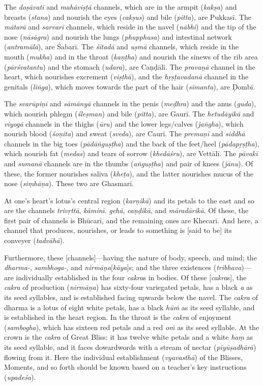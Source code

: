 \documentclass[naipra.tex]{subfiles}
\begin{document}
The \emph{doṣāvatī} and \emph{mahāviṣṭā} channels, which are in the armpit (\emph{kakṣa}) and breasts (\emph{stana}) and nourish the eyes (\emph{cakṣus}) and bile (\emph{pitta}), are Pukkasī.
The \emph{mātarā} and \emph{sarvarī} channels, which reside in the navel (\emph{nābhi}) and the tip of the nose (\emph{nāsāgra}) and nourish the lungs (\emph{phupphusa}) and intestinal network (\emph{antramālā}), are Śabarī.
The \emph{śītadā} and \emph{uṣmā} channels, which reside in the mouth (\emph{mukha}) and in the throat (\emph{kaṇṭha}) and nourish the sinews of the rib area (\emph{pārśvatantu}) and the stomach (\emph{udara}), are Caṇḍālī.
The \emph{pravaṇā} channel in the heart, which nourishes excrement (\emph{viṣṭhā}), and the \emph{hṛṣṭavadanā} channel in the genitals (\emph{liṅga}), which moves towards the part of the hair (\emph{sīmanta}), are Ḍombī.

The \emph{svarūpiṇī} and \emph{sāmānyā} channels in the penis (\emph{meḍhra}) and the anus (\emph{guda}), which nourish phlegm (\emph{śleṣman}) and bile (\emph{pitta}), are Gaurī.
The \emph{hetudāyikā} and \emph{viyogā} channels in the thighs (\emph{ūru}) and the lower legs/calves (\emph{jaṅgha}), which nourish blood (\emph{śoṇita}) and sweat (\emph{sveda}), are Caurī.
The \emph{premaṇī} and \emph{siddhā} channels in the big toes (\emph{pādāṅguṣṭha}) and the back of the feet/heel (\emph{pādapṛṣṭha}), which nourish fat (\emph{medas}) and tears of sorrow (\emph{khedāśru}), are Vettālī.
The \emph{pāvakī} and \emph{sumanā} channels are in the thumbs (\emph{aṅguṣṭha}) and pair of knees (\emph{jānu}).
Of these, the former nourishes saliva (\emph{kheṭa}), and the latter nourishes mucus of the nose (\emph{siṃhāṇa}).
These two are Ghasmarī.

At one's heart's lotus's central region (\emph{karṇikā}) and its petals to the east and so are the channels \emph{trivṛttā}, \emph{kāminī}. \emph{gehā}, \emph{caṇḍikā}, and \emph{māradārikā}.
Of these, the first pair of channels is Bhūcarī, and the remaining ones are Khecarī.
And here, a channel that produces, nourishes, or leads to something is [said to be] its conveyer (\emph{tadvāhā}).

Furthermore, these [channels]—having the nature of body, speech, and mind; the \emph{dharma-}, \emph{sambhoga-}, and \emph{nirmāṇa}[\emph{kāya}]s; and the three existences (\emph{tribhava})—are individually established in the four \emph{cakra}s in bodies.
Of these [\emph{cakra}s], the \emph{cakra} of production (\emph{nirmāṇa}) has sixty-four variegated petals, has a black \emph{a} as its seed syllables, and is established facing upwards below the navel.
The \emph{cakra} of dharma is a lotus of eight white petals, has a black \emph{hūṁ} as its seed syllable, and is established in the heart region.
In the throat is the \emph{cakra} of enjoyment (\emph{sambogha}), which has sixteen red petals and a red \emph{oṁ} as its seed syllable.
At the crown is the \emph{cakra} of Great Bliss: it has twelve white petals and a white \emph{haṃ} as its seed syllable, and it faces dowardwords with a stream of nectar (\emph{pīyūṣadhārā}) flowing from it.
Here the individual establishment (\emph{vyavasthā}) of the Blisses, Moments, and so forth should be known based on a teacher's key instructions (\emph{upadeśa}).
\end{document}
